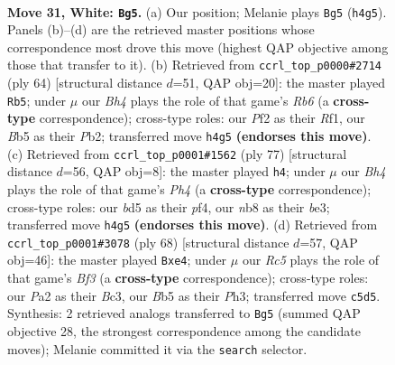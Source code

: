 \documentclass[11pt]{article}
\begin{document}
\clearpage

\begin{figure}[p]\centering
\begin{subfigure}{0.46\textwidth}\centering
\resizebox{\linewidth}{!}{%
\newchessgame
\chessboard[
  setfen={rn4k1/8/4p3/1BRb3p/4r2B/5p1P/PR3P2/6K1 w - - 0 31},
  showmover=false,
  pgfstyle=straightmove, color=movearrow, markmove={h4-g5}
]}
\caption{}
\end{subfigure}\hfill
\begin{subfigure}{0.46\textwidth}\centering
\resizebox{\linewidth}{!}{%
\newchessgame
\chessboard[
  setfen={3r2k1/6p1/1R1P1b2/p4P1p/P1p1rB2/8/1P5P/5R1K w - - 0 33},
  showmover=false,
  pgfstyle=straightmove, color=movearrow, markmove={b6-b5}
]}
\caption{}
\end{subfigure}
\\[4pt]
\begin{subfigure}{0.46\textwidth}\centering
\resizebox{\linewidth}{!}{%
\newchessgame
\chessboard[
  setfen={r3kb2/pp2p3/2r5/PR4Rp/3P1P2/4B2b/3N1K2/8 b - - 1 39},
  showmover=false,
  pgfstyle=straightmove, color=movearrow, markmove={h5-h4}
]}
\caption{}
\end{subfigure}\hfill
\begin{subfigure}{0.46\textwidth}\centering
\resizebox{\linewidth}{!}{%
\newchessgame
\chessboard[
  setfen={r7/7k/1r5p/3b1pp1/3Pn3/2B1RB1P/1P3P1K/2R5 w - - 6 35},
  showmover=false,
  pgfstyle=straightmove, color=movearrow, markmove={f3-e4}
]}
\caption{}
\end{subfigure}
\caption{\textbf{Move 31, White: \texttt{Bg5}.} (a) Our position; Melanie plays \texttt{Bg5} (\texttt{h4g5}). Panels (b)--(d) are the retrieved master positions whose correspondence most drove this move (highest QAP objective among those that transfer to it). (b) Retrieved from \texttt{ccrl\_top\_p0000\#2714} (ply 64) [structural distance $d$=51, QAP obj=20]: the master played \texttt{Rb5}; under $\mu$ our \emph{Bh4} plays the role of that game's \emph{Rb6} (a \textbf{cross-type} correspondence); cross-type roles: our \emph{P}f2 as their \emph{R}f1, our \emph{B}b5 as their \emph{P}b2; transferred move \texttt{h4g5} \textbf{(endorses this move)}. (c) Retrieved from \texttt{ccrl\_top\_p0001\#1562} (ply 77) [structural distance $d$=56, QAP obj=8]: the master played \texttt{h4}; under $\mu$ our \emph{Bh4} plays the role of that game's \emph{Ph4} (a \textbf{cross-type} correspondence); cross-type roles: our \emph{b}d5 as their \emph{p}f4, our \emph{n}b8 as their \emph{b}e3; transferred move \texttt{h4g5} \textbf{(endorses this move)}. (d) Retrieved from \texttt{ccrl\_top\_p0001\#3078} (ply 68) [structural distance $d$=57, QAP obj=46]: the master played \texttt{Bxe4}; under $\mu$ our \emph{Rc5} plays the role of that game's \emph{Bf3} (a \textbf{cross-type} correspondence); cross-type roles: our \emph{P}a2 as their \emph{B}c3, our \emph{B}b5 as their \emph{P}h3; transferred move \texttt{c5d5}. Synthesis: 2 retrieved analogs transferred to \texttt{Bg5} (summed QAP objective 28, the strongest correspondence among the candidate moves); Melanie committed it via the \texttt{search} selector.}
\label{fig:thought-m60}
\end{figure}
\end{document}
